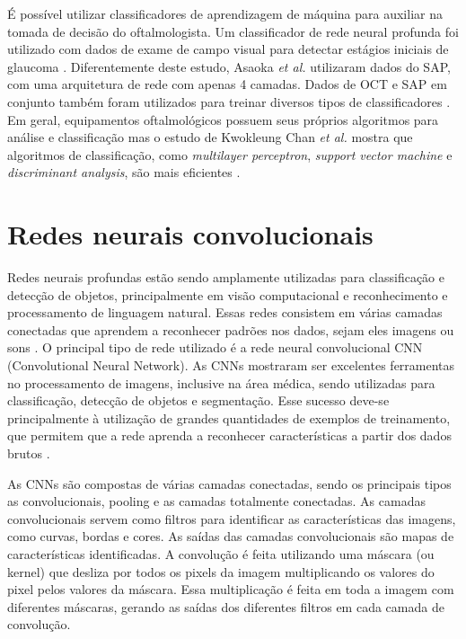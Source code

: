 \documentclass[conference]{IEEEtran}
\begin{document}
É possível utilizar classificadores de aprendizagem de máquina para auxiliar na tomada de decisão do oftalmologista. Um classificador de rede neural profunda foi utilizado com dados de exame de campo visual para detectar estágios iniciais de glaucoma \cite{Asaoka2016}. Diferentemente deste estudo, Asaoka \textit{et al.} utilizaram dados do SAP, com uma arquitetura de rede com apenas 4 camadas. Dados de OCT e SAP em conjunto também foram utilizados para treinar diversos tipos de classificadores \cite{bowd2008, silva2013}. Em geral, equipamentos oftalmológicos possuem seus próprios algoritmos para análise e classificação mas o estudo de Kwokleung Chan \textit{et al.} mostra que algoritmos de classificação, como \textit{multilayer perceptron}, \textit{support vector machine} e \textit{discriminant analysis}, são mais eficientes \cite{kwokleung2002}.


\section{Redes neurais convolucionais}


Redes neurais profundas estão sendo amplamente utilizadas para classificação e detecção de objetos, principalmente em visão computacional e reconhecimento e processamento de linguagem natural. Essas redes consistem em várias camadas conectadas que aprendem a reconhecer padrões nos dados, sejam eles imagens ou sons \cite{LeCun2015}. O principal tipo de rede utilizado é a rede neural convolucional CNN (Convolutional Neural Network). As CNNs mostraram ser excelentes ferramentas no processamento de imagens, inclusive na área médica, sendo utilizadas para classificação, detecção de objetos e segmentação. Esse sucesso deve-se principalmente à utilização de grandes quantidades de exemplos de treinamento, que permitem que a rede aprenda a reconhecer características a partir dos dados brutos \cite{greenspan2016}. %

As CNNs são compostas de várias camadas conectadas, sendo os principais tipos as convolucionais, pooling e as camadas totalmente conectadas. As camadas convolucionais servem como filtros para identificar as características das imagens, como curvas, bordas e cores. As saídas das camadas convolucionais são mapas de características identificadas. A convolução é feita utilizando uma máscara (ou kernel) que desliza por todos os pixels da imagem multiplicando os valores do pixel pelos valores da máscara. Essa multiplicação é feita em toda a imagem com diferentes máscaras, gerando as saídas dos diferentes filtros em cada camada de convolução.
\end{document}
